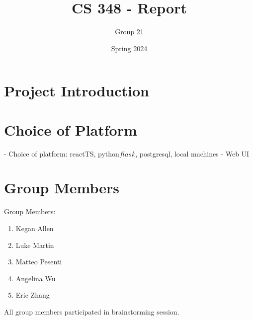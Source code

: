 \documentclass{article}
\title{CS 348 - Report}
\author{Group 21}
\date{Spring 2024}
\begin{document}
\maketitle

\section{Project Introduction}

\section{Choice of Platform}

- Choice of platform: reactTS, python\(flask\), postgresql, local machines
- Web UI

\section{Group Members}

Group Members:
\begin{enumerate}
    \item Kegan Allen
    \item Luke Martin
    \item Matteo Pesenti
    \item Angelina Wu
    \item Eric Zhang
\end{enumerate}

All group members participated in brainstorming session.
\end{document}
